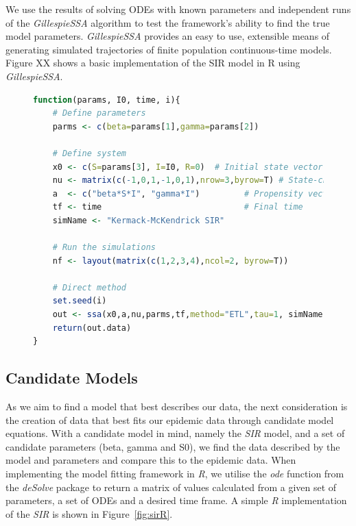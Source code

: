 \documentclass[11pt, a4paper, oneside,titlepage]{article}
\begin{document}
We use the results of solving ODEs with known parameters and
independent runs of the \emph{GillespieSSA} algorithm to test the
framework's ability to find the true model
parameters. \emph{GillespieSSA} provides an easy to use, extensible
means of generating simulated trajectories of finite population
continuous-time models. Figure XX shows a basic implementation of the
SIR model in R using \emph{GillespieSSA}.

\begin{center}
\begin{figure}[!]

\begin{lstlisting}[language=R, style=customc]
function(params, I0, time, i){
    # Define parameters
    parms <- c(beta=params[1],gamma=params[2])
    
    # Define system
    x0 <- c(S=params[3], I=I0, R=0)  # Initial state vector
    nu <- matrix(c(-1,0,1,-1,0,1),nrow=3,byrow=T) # State-change matrix
    a  <- c("beta*S*I", "gamma*I")         # Propensity vector
    tf <- time                             # Final time
    simName <- "Kermack-McKendrick SIR"

    # Run the simulations
    nf <- layout(matrix(c(1,2,3,4),ncol=2, byrow=T))
    
    # Direct method
    set.seed(i)
    out <- ssa(x0,a,nu,parms,tf,method="ETL",tau=1, simName,verbose=FALSE)
    return(out.data)
}
\end{lstlisting}
\end{figure}
\end{center}



\subsection{Candidate Models}
As we aim to find a model that best describes our data, the next
consideration is the creation of data that best fits our epidemic data
through candidate model equations. With a candidate model in mind,
namely the \emph{SIR} model, and a set of candidate parameters (beta,
gamma and S0), we find the data described by the model and parameters
and compare this to the epidemic data. When implementing the model fitting
framework in \emph{R}, we utilise the \emph{ode} function from the
\emph{deSolve} package to return a matrix of values calculated from a
given set of parameters, a set of ODEs and a desired time frame. A
simple \emph{R} implementation of the \emph{SIR} is shown in Figure~\ref{fig:sirR}.
\end{document}
